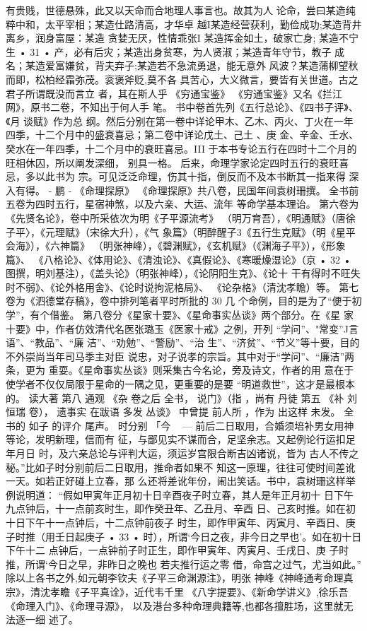 有贵贱，世德悬殊，此又以天命而合地理人事言也。故其为人
论命，尝曰某造纯粹中和，太平宰相；某造仕路清高，才华卓
越I某造经营获利，勤俭成功;某造背井离乡，润身富屋：某造
贪婪无厌，性情乖张I 某造挥金如土，破家亡身; 某造不宁生
• 31 •
产，必有后灾；某造出身贫寒，为人贤淑；某造青年守节，教子
成名；某造爱富嫌贫，背夫弃子;某造若不急流勇退，能无意外
风波？某造蒲柳望秋而即，松柏经霜弥茂。衮褒斧贬,莫不各
具苦心，大义微言，要皆有关世道。古之君子所谓既没而言立
者，其在斯人乎
《穷通宝鉴》
《穷通宝鉴》又名《拦江网》，原书二卷，不知出于何人手
笔。
书中卷首先列《五行总论》、《四书子评》、《月 谈赋》作为总
纲。然后分别在第一卷中详论甲木、乙木、丙火、丁火在一年
四季，十二个月中的盛衰喜忌；第二卷中详论戊土、己土 、庚
金、辛金、壬水、癸水在一年四季，十二个月中的衰旺喜忌。III
于本书专论五行在四时十二个月的旺相休囚，所以阐发深细，
别具一格。
后来，命理学家论定四时五行的衰旺喜忌，多以此书为
宗。可见泛泛命理，伤其十指，倒反而不及本书断其一指来得
深入有得。 - 鹏
- 《命理探原》
《命理探原》共八卷，民国年间袁树珊撰。
全书前五卷为四时五行，星宿神煞，以及六亲、大运、流年
等命学基本理诒。
第六卷为《先贤名论》，卷中所采依次为明《子平源流考》
（明万育吾），《明通赋》（唐徐子平〉，《元理赋》（宋徐大升），《气
象篇》（明醉醒子3《五行生克赋》（明《星平会海》），《六神篇》
（明张神峰），《碧渊赋》，《玄机赋》（《渊海子平》），《形象篇》、
《八格论》、《体用论》、《清浊论》、《真假论》、《寒暖燥湿论》（京
• 32 •
图撰，明刘基注），《盖头论》（明张神峰），《论阴阳生克》、《论十
干有得时不旺失时不弱》、《论外格用舍》、《论时说拘泥格局》、
《论杂格》（清沈孝瞻）等。
第七卷为《泗德堂存稿》，卷中排列笔者平时所批的 30 几
个命例，目的是为了“便于初学”，有个借鉴。
第八卷分《星家十要》、《星命事实丛谈》两个部分。在《星
家十要》中，作者仿效清代名医张璐玉《医家十戒》之例，开列
“学问”、"常变”J言语”、“教品”、“廉 洁”、“劝勉”、“警励”、“治
生”、“济贫”、“节义”等十要，目的不外崇尚当年司马季主对臣
说忠，对子说孝的宗旨。其中对于“学问”、“廉洁”两条，更为
重耍。《星命事实丛谈》则采集古今名论，旁及诗文，作者的用
意在于使学者不仅仅局限于星命的一隅之见，更重要的是要
“明道救世”，这才是最根本的。
读大著
第八
通观
《杂
卷之后
全书，
说门》（指
，尚有
丹徒
第五
《补
刘恒瑞
卷），
遗事实
在跋语
多发
丛谈》
中曾提
前人所
，作为
出这样
未发。
全书的
如子
的评介
尾声。
时分别
「今
~
— 前后二日取用，合婚须培补男女用神等论，发明新理，信而有
征，与鄙见实不谋而合，足坚余志。又起例论行运扣足年月日
时，及六亲总论与评判大运，须运岁宫限合断吉凶诸说，皆为
古人不传之秘。”比如子时分别前后二日取用，推命者如果不
知这一原理，往往可使时间差讹一天。如若正好碰上立春，那
么还将差讹年份，闹出笑话。书中，袁树珊这样举例说明道：
“假如甲寅年正月初十日辛酉夜子时立春，其人是年正月初十
日下午九点钟后，十一点前亥时生，即作癸丑年、乙丑月、辛酉
日、己亥时推。如在初十日下午十一点钟后，十二点钟前夜子
时生，即作甲寅年、丙寅月、辛酉日、庚子时推（用壬日起庚子
• 33 •
时），所谓‘今日之夜，非今日之早也'。如在初十日下午十二
点钟后，一点钟前子时正生，即作甲寅年、丙寅月、壬戌日、庚
子时推，所谓‘今日之早，非昨日之晚也 若夫推行运之零
借，命宫之过气，尤当如此。”
除以上各书之外,如元朝李钦夫《子平三命渊源注》，明张
神峰《神峰通考命理真宗》，清沈孝瞻《子平真诠》，近代韦千里
《八字提要》、《新命学讲义》,徐乐吾《命理入门》、《命理寻源》，
以及港台多种命理典籍等,也都各擅胜场，这里就无法逐一细
述了。